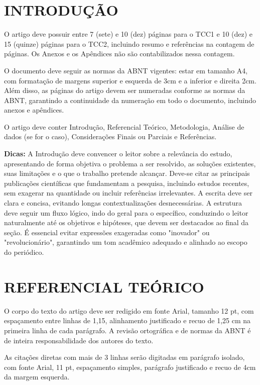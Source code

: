 \documentclass[
	article,			%
	12pt,				%
	oneside,			%
	a4paper,			%
	english,			%
	brazil,				%
	sumario=tradicional
]{abntex2}
\begin{document}
\section{INTRODUÇÃO}

O artigo deve possuir entre 7 (sete) e 10 (dez) páginas para o TCC1 e 10
(dez) e 15 (quinze) páginas para o TCC2, incluindo resumo e referências na
contagem de páginas. Os Anexos e os Apêndices não são contabilizados nessa
contagem.

O documento deve seguir as normas da ABNT vigentes: estar em tamanho A4, com
formatação de margens superior e esquerda de 3cm e a inferior e direita 2cm.
Além disso, as páginas do artigo devem ser numeradas conforme as normas da
ABNT, garantindo a continuidade da numeração em todo o documento, incluindo
anexos e apêndices.

O artigo deve conter Introdução, Referencial Teórico, Metodologia, Análise
de dados (se for o caso), Considerações Finais ou Parciais e Referências.

\textbf{Dicas:} A Introdução deve convencer o leitor sobre a relevância do
estudo, apresentando de forma objetiva o problema a ser resolvido, as
soluções existentes, suas limitações e o que o trabalho pretende alcançar.
Deve-se citar as principais publicações científicas que fundamentam a
pesquisa, incluindo estudos recentes, sem exagerar na quantidade ou incluir
referências irrelevantes. A escrita deve ser clara e concisa, evitando longas
contextualizações desnecessárias. A estrutura deve seguir um fluxo lógico,
indo do geral para o específico, conduzindo o leitor naturalmente até os
objetivos e hipóteses, que devem ser destacados ao final da seção. É
essencial evitar expressões exageradas como "inovador" ou "revolucionário",
garantindo um tom acadêmico adequado e alinhado ao escopo do periódico.

\section{REFERENCIAL TEÓRICO}

O corpo do texto do artigo deve ser redigido em fonte Arial, tamanho 12 pt,
com espaçamento entre linhas de 1,15, alinhamento justificado e recuo de
1,25 cm na primeira linha de cada parágrafo. A revisão ortográfica e de
normas da ABNT é de inteira responsabilidade dos autores do texto.

As citações diretas com mais de 3 linhas serão digitadas em parágrafo
isolado, com fonte Arial, 11 pt, espaçamento simples, parágrafo justificado e
recuo de 4cm da margem esquerda.
\end{document}
